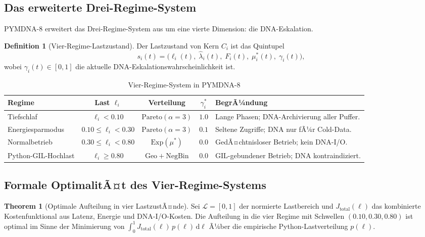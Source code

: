 ﻿\documentclass[a4paper,12pt]{article}
\theoremstyle{definition}
\newtheorem{definition}{Definition}[section]
\newtheorem{theorem}{Theorem}[section]
\newcommand{\Exp}{\mathrm{Exp}}
\newcommand{\Geo}{\mathrm{Geo}}
\newcommand{\NBin}{\mathrm{NegBin}}
\newcommand{\Pareto}{\mathrm{Pareto}}
\begin{document}
\subsection{Das erweiterte Drei-Regime-System}

PYMDNA-8 erweitert das Drei-Regime-System aus \cite{epp2026pymca8} um eine
vierte Dimension: die DNA-Eskalation.

\begin{definition}[Vier-Regime-Lastzustand]
  \label{def:vier_regime}
  Der Lastzustand von Kern $C_i$ ist das Quintupel
  \[
    s_i(t) = \bigl(\ell_i(t),\; \hat\lambda_i(t),\; F_i(t),\; \mu_i^*(t),\;
    \gamma_i(t)\bigr),
  \]
  wobei $\gamma_i(t) \in [0,1]$ die aktuelle DNA-Eskalationswahrscheinlichkeit ist.
\end{definition}

\begin{table}[H]
  \centering
  \caption{Vier-Regime-System in PYMDNA-8}
  \label{tab:vier_regime}
  \renewcommand{\arraystretch}{1.4}
  \begin{tabular}{lcccp{3.5cm}}
    \toprule
    \textbf{Regime} & \textbf{Last $\ell_i$} & \textbf{Verteilung}
    & \textbf{$\gamma_i^*$} & \textbf{BegrÃ¼ndung} \\
    \midrule
    Tiefschlaf & $\ell_i < 0.10$ & $\Pareto(\alpha=3)$ & $1.0$
    & Lange Phasen; DNA-Archivierung aller Puffer. \\
    Energiesparmodus & $0.10 \le \ell_i < 0.30$ & $\Pareto(\alpha=3)$ & $0.1$
    & Seltene Zugriffe; DNA nur fÃ¼r Cold-Data. \\
    Normalbetrieb & $0.30 \le \ell_i < 0.80$ & $\Exp(\mu^*)$ & $0.0$
    & GedÃ¤chtnisloser Betrieb; kein DNA-I/O. \\
    Python-GIL-Hochlast & $\ell_i \ge 0.80$ & $\Geo + \NBin$ & $0.0$
    & GIL-gebundener Betrieb; DNA kontraindiziert. \\
    \bottomrule
  \end{tabular}
\end{table}

\subsection{Formale OptimalitÃ¤t des Vier-Regime-Systems}

\begin{theorem}[Optimale Aufteilung in vier LastzustÃ¤nde]
  \label{thm:vier_regime_optimal}
  Sei $\mathcal{L} = [0,1]$ der normierte Lastbereich und
  $J_{\mathrm{total}}(\ell)$ das kombinierte Kostenfunktional aus
  Latenz, Energie und DNA-I/O-Kosten. Die Aufteilung in die vier Regime
  mit Schwellen $(0.10, 0.30, 0.80)$ ist optimal im Sinne der Minimierung
  von $\int_0^1 J_{\mathrm{total}}(\ell)\,p(\ell)\,\mathrm{d}\ell$ Ã¼ber
  die empirische Python-Lastverteilung $p(\ell)$.
\end{theorem}
\end{document}
